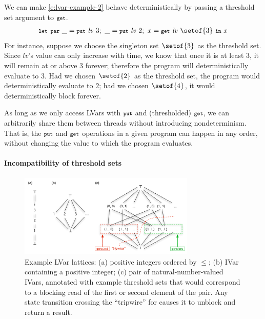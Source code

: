 We can make \ref{e:lvar-example-2} behave deterministically by passing
a threshold set argument to $\mbox{\footnotesize \texttt{get}}$.
\begin{equation}
\begin{split}
\LETPAR ~\_ = \putexp{\mathit{lv}}{3};
  ~\_ = \putexp{\mathit{lv}}{2}; 
  ~x = \getexp{\mathit{lv}}{\setof{3}} 
  ~ \IN~x
\end{split}
\label{e:lvar-example-3}
\end{equation}
\fi
For instance, suppose we choose the singleton set $\setof{3}$ as the threshold set.  
Since $\mathit{lv}$'s value can only increase with time, we know that
once it is at least $3$, it will remain at or above $3$ forever;
therefore the program will deterministically evaluate to
$3$.  Had we chosen $\setof{2}$ as the threshold set,
the program would deterministically evaluate to $2$; had we
chosen $\setof{4}$, it would deterministically block forever.

As long as we only access LVars with $\mbox{\footnotesize \texttt{put}}$ and (thresholded) $\mbox{\footnotesize \texttt{get}}$, we can
arbitrarily share them between threads without introducing nondeterminism. That
is, the $\mbox{\footnotesize \texttt{put}}$ and $\mbox{\footnotesize \texttt{get}}$ operations in a given program can happen in any order,
without changing the value to which the program evaluates.

\paragraph{Incompatibility of threshold sets}

\begin{figure}
\centering
\includegraphics[width=3.3in]{figures/ExampleLattices3.pdf} 
  \caption{Example LVar lattices: (a)
    positive integers ordered by $\leq$; (b) IVar
    containing a positive integer; (c) pair of natural-number-valued IVars, 
    annotated with example threshold
    sets that would correspond to a blocking read of the first or
    second element of the pair.
    Any state transition crossing the
    ``tripwire'' for  causes it to unblock
    and return a result.}

  \label{f:lattice-examples}
\end{figure}

